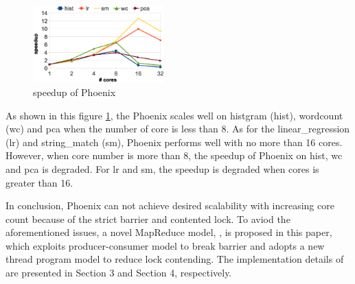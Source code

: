 
\begin{figure}[!h!t]  
	\centering
	\includegraphics[width=0.45\textwidth]{eps/phoenix_speedup.eps}
	\caption{speedup of Phoenix}
	\label{fig:phoenix:speedup}
\end{figure}

As shown in this figure \ref{fig:phoenix:speedup}, 
the Phoenix scales well on histgram (hist), wordcount (wc) and pca when the number of core is less than 8.
As for the linear\_regression (lr) and string\_match (sm), 
Phoenix performs well with no more than 16 cores.
However, when core number is more than  8, 
the speedup of Phoenix  on hist,  wc and pca is degraded.
For lr and sm, the speedup is degraded when cores is greater than 16.





In conclusion, Phoenix can not achieve desired scalability with increasing core count because of the strict barrier and contented lock.
To aviod the aforementioned issues, a novel MapReduce model, \myds,  is proposed in this paper,
which exploits producer-consumer model to break barrier
and adopts a new thread program model to reduce lock contending.
The implementation details of \myds are presented in Section 3 and Section 4, respectively.  







